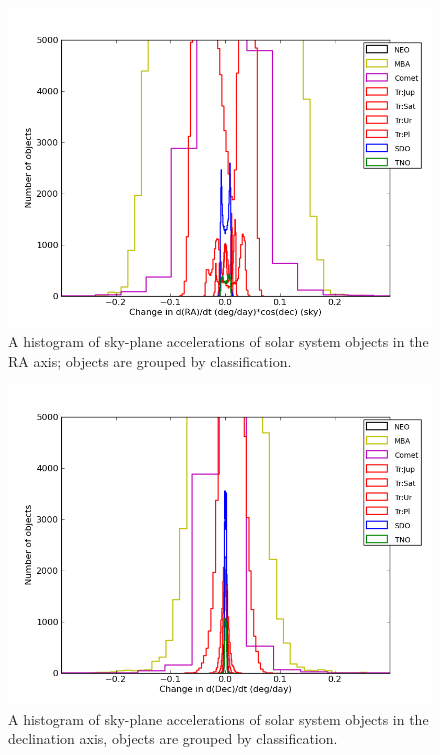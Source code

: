 \documentclass[12pt,preprint]{aastex}
\begin{document}
\begin{figure}[ht!]
  \centering
  \includegraphics[width=13cm]{illustrations/mopsplots/hist_accRA_sky2.png}
  \caption{A histogram of sky-plane accelerations of solar system
    objects in the RA axis; objects are grouped by classification.}
  \label{raAccSurvey}
\end{figure}

\begin{figure}[ht!]
  \centering
  \includegraphics[width=13cm]{illustrations/mopsplots/hist_accDec2.png}
  \caption{A histogram of sky-plane accelerations of solar system
    objects in the declination axis, objects are grouped by
    classification.}
  \label{decAccSurvey}
\end{figure}
\end{document}
